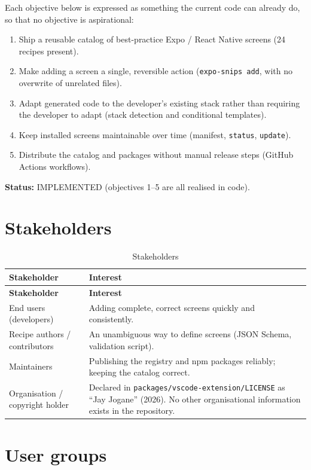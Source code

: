 Each objective below is expressed as something the current code can already do,
so that no objective is aspirational:

\begin{enumerate}
  \item Ship a reusable catalog of best-practice Expo / React Native screens
        (24 recipes present).
  \item Make adding a screen a single, reversible action
        (\texttt{expo-snips add}, with no overwrite of unrelated files).
  \item Adapt generated code to the developer's existing stack rather than
        requiring the developer to adapt (stack detection and conditional
        templates).
  \item Keep installed screens maintainable over time (manifest, \texttt{status},
        \texttt{update}).
  \item Distribute the catalog and packages without manual release steps
        (GitHub Actions workflows).
\end{enumerate}

\textbf{Status:} IMPLEMENTED (objectives 1--5 are all realised in code).

\section{Stakeholders}

\begin{longtable}{@{}L{4.2cm}L{10.2cm}@{}}
\caption{Stakeholders}\\
\toprule
\textbf{Stakeholder} & \textbf{Interest} \\
\midrule
\endfirsthead
\toprule
\textbf{Stakeholder} & \textbf{Interest} \\
\midrule
\endhead
End users (developers) & Adding complete, correct screens quickly and consistently. \\
Recipe authors / contributors & An unambiguous way to define screens (JSON Schema, validation script). \\
Maintainers & Publishing the registry and npm packages reliably; keeping the catalog correct. \\
Organisation / copyright holder & Declared in \texttt{packages/vscode-extension/LICENSE} as ``Jay Jogane'' (2026). No other organisational information exists in the repository. \\
\bottomrule
\end{longtable}

\section{User groups}

